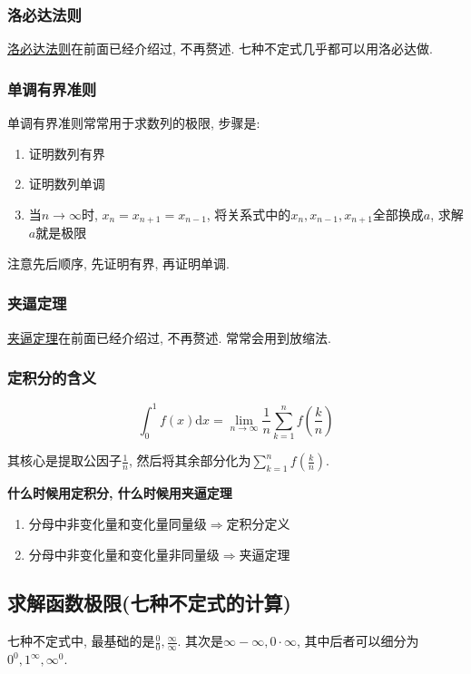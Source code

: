 \subsubsection{洛必达法则}
\hyperref[洛必达法则]{洛必达法则}在前面已经介绍过, 不再赘述. 七种不定式几乎都可以用洛必达做.
\subsubsection{单调有界准则}\label{单调有界准则算极限}
单调有界准则常常用于求数列的极限, 步骤是:
\begin{enumerate}
    \item 证明数列有界
    \item 证明数列单调
    \item 当$ n\rightarrow \infty $时, $ x_{n}=x_{n+1}=x_{n-1} $, 将关系式中的$ x_{n}, x_{n-1}, x_{n+1} $全部换成$ a $, 求解$ a $就是极限
\end{enumerate}\par
注意先后顺序, 先证明有界, 再证明单调.
\subsubsection{夹逼定理}
\hyperref[夹逼定理]{夹逼定理}在前面已经介绍过, 不再赘述. 常常会用到放缩法.
\subsubsection{定积分的含义}
\begin{equation*}
    \int_{0}^{1}f(x)\mathrm{d}x=\lim\limits_{n \rightarrow \infty}\frac{1}{n}\sum_{k=1}^{n}f(\frac{k}{n})
\end{equation*}\par
其核心是提取公因子$ \frac{1}{n} $, 然后将其余部分化为$ \sum_{k=1}^{n}f(\frac{k}{n}) $.
\begin{tcolorbox}
    \textbf{什么时候用定积分, 什么时候用夹逼定理}
    \begin{enumerate}
        \item 分母中非变化量和变化量同量级$ \Rightarrow $定积分定义
        \item 分母中非变化量和变化量非同量级$ \Rightarrow $夹逼定理
    \end{enumerate}
\end{tcolorbox}
\subsection{求解函数极限(七种不定式的计算)}
七种不定式中, 最基础的是$ \frac{0}{0}, \frac{\infty}{\infty} $. 其次是$ \infty-\infty, 0\cdot\infty $, 其中后者可以细分为$ 0^{0}, 1^{\infty}, \infty^{0} $.
